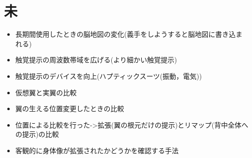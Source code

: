 \section{未}
    \begin{itemize}
    \item 長期間使用したときの脳地図の変化(義手をしようすると脳地図に書き込まれる)
    \item 触覚提示の周波数帯域を広げる(より細かい触覚提示)
    \item 触覚提示のデバイスを向上(ハプティックスーツ(振動，電気))
    \item 仮想翼と実翼の比較
    \item 翼の生える位置変更したときの比較
    \item 位置による比較を行った->拡張(翼の根元だけの提示)とリマップ(背中全体への提示)の比較
    \item 客観的に身体像が拡張されたかどうかを確認する手法
    \end{itemize}